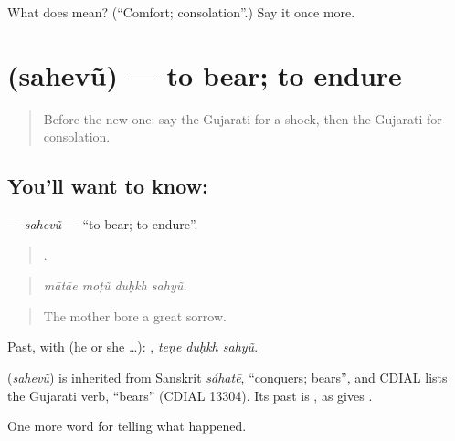 \begin{tcolorbox}[breakable,colback=teal!4,colframe=teal!35!black,title={Before you move on}]
What does  mean? (\textquotedblleft{}Comfort; consolation\textquotedblright{}.) Say it once more.
\end{tcolorbox}
\section[\texorpdfstring{\gu{સહેવું} (sahevũ)}{સહેવું (sahevũ)}]{ (sahevũ) — to bear; to endure}

\label{lesson:GU-C298-sahevu}



\begin{quote}
Before the new one: say the Gujarati for a shock, then the Gujarati for consolation.
\end{quote}

\subsection*{You'll want to know: }
\textbf{} — \emph{sahevũ} — \textquotedblleft{}to bear; to endure\textquotedblright{}.

\begin{quote}
   .
\end{quote}

\begin{quote}
\emph{mātāe moṭũ duḥkh sahyũ.}
\end{quote}

\begin{quote}
The mother bore a great sorrow.
\end{quote}

Past, with  (he or she …):   , \emph{teṇe duḥkh sahyũ}.

\begin{cousinweb}
\textbf{} (\emph{sahevũ}) is inherited from Sanskrit \emph{sáhatē}, \textquotedblleft{}conquers; bears\textquotedblright{}, and CDIAL lists the Gujarati verb, \textquotedblleft{}bears\textquotedblright{} (CDIAL 13304). Its past is \textbf{}, as \textbf{} gives \textbf{}.
\end{cousinweb}

\begin{grammarlens}[title={What you've built}]
One more word for telling what happened.
\end{grammarlens}

